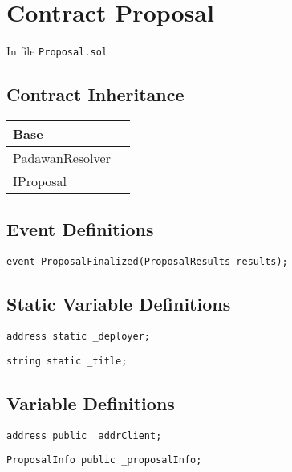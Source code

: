 
\chapter{Contract Proposal}

\minitoc

In file {\tt Proposal.sol}

\section{Contract Inheritance}


\noindent\begin{tabular}{|l|p{5cm}|}\hline
Base & \\\hline
PadawanResolver & \\\hline
IProposal & \\\hline
\end{tabular}


\section{Event Definitions}


\begin{lstlisting}[firstnumber=23]
    event ProposalFinalized(ProposalResults results);
\end{lstlisting}

\section{Static Variable Definitions}


\begin{lstlisting}[firstnumber=13]
    address static _deployer;
\end{lstlisting}

\begin{lstlisting}[firstnumber=14]
    string static _title;
\end{lstlisting}

\section{Variable Definitions}

\begin{lstlisting}[firstnumber=16]
    address public _addrClient;
\end{lstlisting}

\begin{lstlisting}[firstnumber=18]
    ProposalInfo public _proposalInfo;
\end{lstlisting}

